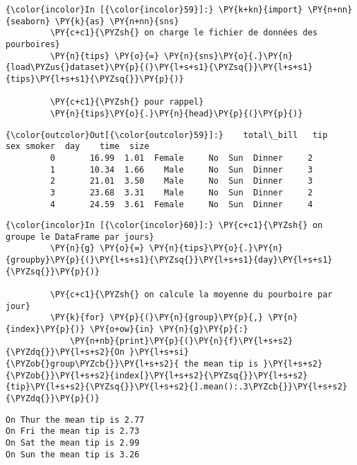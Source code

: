     \begin{Verbatim}[commandchars=\\\{\}]
{\color{incolor}In [{\color{incolor}59}]:} \PY{k+kn}{import} \PY{n+nn}{seaborn} \PY{k}{as} \PY{n+nn}{sns}
         \PY{c+c1}{\PYZsh{} on charge le fichier de données des pourboires}
         \PY{n}{tips} \PY{o}{=} \PY{n}{sns}\PY{o}{.}\PY{n}{load\PYZus{}dataset}\PY{p}{(}\PY{l+s+s1}{\PYZsq{}}\PY{l+s+s1}{tips}\PY{l+s+s1}{\PYZsq{}}\PY{p}{)}
         
         \PY{c+c1}{\PYZsh{} pour rappel}
         \PY{n}{tips}\PY{o}{.}\PY{n}{head}\PY{p}{(}\PY{p}{)}
\end{Verbatim}


\begin{Verbatim}[commandchars=\\\{\}]
{\color{outcolor}Out[{\color{outcolor}59}]:}    total\_bill   tip     sex smoker  day    time  size
         0       16.99  1.01  Female     No  Sun  Dinner     2
         1       10.34  1.66    Male     No  Sun  Dinner     3
         2       21.01  3.50    Male     No  Sun  Dinner     3
         3       23.68  3.31    Male     No  Sun  Dinner     2
         4       24.59  3.61  Female     No  Sun  Dinner     4
\end{Verbatim}
            
    \begin{Verbatim}[commandchars=\\\{\}]
{\color{incolor}In [{\color{incolor}60}]:} \PY{c+c1}{\PYZsh{} on groupe le DataFrame par jours}
         \PY{n}{g} \PY{o}{=} \PY{n}{tips}\PY{o}{.}\PY{n}{groupby}\PY{p}{(}\PY{l+s+s1}{\PYZsq{}}\PY{l+s+s1}{day}\PY{l+s+s1}{\PYZsq{}}\PY{p}{)}
         
         \PY{c+c1}{\PYZsh{} on calcule la moyenne du pourboire par jour}
         \PY{k}{for} \PY{p}{(}\PY{n}{group}\PY{p}{,} \PY{n}{index}\PY{p}{)} \PY{o+ow}{in} \PY{n}{g}\PY{p}{:}
             \PY{n+nb}{print}\PY{p}{(}\PY{n}{f}\PY{l+s+s2}{\PYZdq{}}\PY{l+s+s2}{On }\PY{l+s+si}{\PYZob{}group\PYZcb{}}\PY{l+s+s2}{ the mean tip is }\PY{l+s+s2}{\PYZob{}}\PY{l+s+s2}{index[}\PY{l+s+s2}{\PYZsq{}}\PY{l+s+s2}{tip}\PY{l+s+s2}{\PYZsq{}}\PY{l+s+s2}{].mean():.3\PYZcb{}}\PY{l+s+s2}{\PYZdq{}}\PY{p}{)}
\end{Verbatim}


    \begin{Verbatim}[commandchars=\\\{\}]
On Thur the mean tip is 2.77
On Fri the mean tip is 2.73
On Sat the mean tip is 2.99
On Sun the mean tip is 3.26

    \end{Verbatim}

